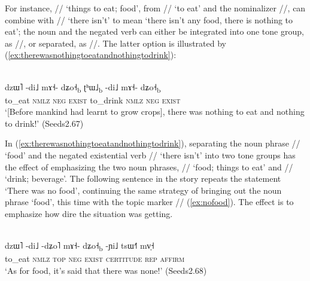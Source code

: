 For instance, // ‘things to eat; food’, from // ‘to eat’ and the
{nominalizer} //, can combine with // ‘there isn’t’ to mean ‘there isn’t any
food, there is nothing to eat’; the noun and the negated verb can either be integrated into one
tone group, as //, or separated, as //. The latter
option is illustrated by (\ref{ex:therewasnothingtoeatandnothingtodrink}):

\begin{exe}
  \ex
  \label{ex:therewasnothingtoeatandnothingtodrink}
  \\
  \gll dzɯ˥	-di˩	mɤ˧-	dʑo˧\textsubscript{b}	ʈʰɯ˩\textsubscript{b}	-di˩	mɤ˧-	dʑo˧\textsubscript{b}\\
  to\_eat	\textsc{nmlz}	\textsc{neg}	\textsc{exist}	to\_drink	\textsc{nmlz}	\textsc{neg}
  \textsc{exist}\\
  \glt ‘[Before mankind had learnt to grow crops], there was nothing to eat and nothing to drink!’
  (Seeds2.67)
\end{exe}

In
(\ref{ex:therewasnothingtoeatandnothingtodrink}), separating the noun phrase // ‘food’ and the negated existential verb // ‘there
isn’t’ into two tone groups has the effect of emphasizing the two noun
phrases, // ‘food; things to eat’ and // ‘drink; beverage’. 
The following sentence in the story repeats the statement ‘There was no food’, continuing the same
strategy of bringing out the noun phrase ‘food’, this time with the topic marker // (\ref{ex:nofood}). The effect is to emphasize how dire the situation was getting.

\begin{exe}
	\ex
	\label{ex:nofood}
	\\
	\gll dzɯ˥	-di˩				-dʑo˥				mɤ˧-			dʑo˧\textsubscript{b}			-ɲi˩							tsɯ˧˥				mv̩˧\\
		to\_eat		\textsc{nmlz}	\textsc{top}	\textsc{neg}	\textsc{exist}	\textsc{certitude}	\textsc{rep}	\textsc{affirm}\\
	\glt  ‘As for food, it’s said that there was none!’	(Seeds2.68)
\end{exe}

